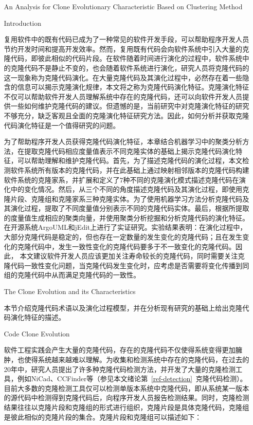 
{An Analysis for Clone Evolutionary Characteristic Based on Clustering Method}

{Introduction}

复用软件中的既有代码已成为了一种常见的软件开发手段，可以帮助程序开发人员节约开发时间和提高开发效率。然而，复用既有代码会向软件系统中引入大量的克隆代码，即彼此相似的代码片段。在软件随着时间进行演化的过程中，软件系统中的克隆代码不是静止不变的，也会随着软件系统进行演化，研究人员将克隆代码的这一现象称为克隆代码演化。在大量克隆代码及其演化过程中，必然存在着一些隐含的信息可以揭示克隆演化规律，本文将之称为克隆代码演化特征。克隆演化特征不仅可以帮助软件开发人员理解系统中存在的克隆代码，还可以向软件开发人员提供一些如何维护克隆代码的建议。但遗憾的是，当前研究中对克隆演化特征的研究不够充分，缺乏客观且全面的克隆演化特征研究方法。因此，如何分析并获取克隆代码演化特征是一个值得研究的问题。

为了帮助程序开发人员获得克隆代码演化特征，本章结合机器学习中的聚类分析方法，在提取克隆代码相应度量值表示不同克隆实体的基础上揭示克隆代码演化特征，可以帮助理解和维护克隆代码。首先，为了描述克隆代码的演化过程，本文检测软件系统所有版本的克隆代码，并在此基础上通过映射相邻版本的克隆代码构建软件系统的克隆家系，并扩展和定义了7种不同的克隆演化模式描述克隆代码在演化中的变化情况。然后，从三个不同的角度描述克隆代码及其演化过程，即使用克隆片段、克隆组和克隆家系三种克隆实体。为了使用机器学习方法分析克隆代码及其演化过程，提取了不同度量值分别表示不同的克隆代码实体。最后，根据所提取的度量值生成相应的聚类向量，并使用聚类分析挖掘和分析克隆代码的演化特征。在开源系统ArgoUML和jEdit上进行了实证研究。实验结果表明：在演化过程中，大部分克隆代码是稳定的，但也存在一定数量的发生变化的克隆代码；且在发生变化的克隆代码中，发生一致性变化的克隆代码要多于不一致变化的克隆代码。因此， 本文建议软件开发人员应该更加关注寿命较长的克隆代码，同时需要关注克隆代码一致性变化问题，当克隆代码发生变化时，应考虑是否需要将变化传播到同组的克隆代码中从而满足克隆代码的一致性。

{The Clone Evolution and its Characteristics}

本节介绍克隆代码术语以及演化过程模型，并在分析现有研究的基础上给出克隆代码演化特征的描述。

{Code Clone Evolution}
\label{lab-evolution}

软件工程实践会产生大量的克隆代码，存在的克隆代码不仅使得系统变得更加臃肿，也使得系统越来越难以理解。为收集和检测系统中存在的克隆代码，在过去的20年中，研究人员提出了许多种克隆代码检测方法，并开发了大量的克隆检测工具，例如NiCad\cite{roy2008nicad}、CCFinder\cite{kamiya2002ccfinder}等（参见本文绪论第~\ref{ref-detection}~克隆代码检测）。目前大多数的克隆检测工具仅可以检测单版本系统中克隆代码，即从系统某一版本的源代码中检测得到克隆代码后，向程序开发人员报告检测结果。同时，克隆检测结果往往以克隆片段和克隆组的形式进行组织，克隆片段是具体克隆代码，克隆组是彼此相似的克隆片段的集合。克隆片段和克隆组可以描述如下：\\

